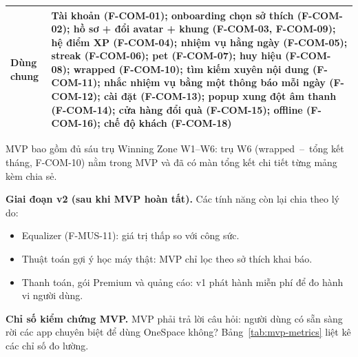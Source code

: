 \begin{table}[H]
\begin{tabularx}{\textwidth}{>{\raggedright\arraybackslash}p{1.8cm} >{\raggedright\arraybackslash}X}
    Dùng chung & Tài khoản (F-COM-01); onboarding chọn sở thích (F-COM-02); hồ sơ + đổi avatar + khung (F-COM-03, F-COM-09); hệ điểm XP (F-COM-04); nhiệm vụ hằng ngày (F-COM-05); streak (F-COM-06); pet (F-COM-07); huy hiệu (F-COM-08); wrapped (F-COM-10); tìm kiếm xuyên nội dung (F-COM-11); nhắc nhiệm vụ bằng một thông báo mỗi ngày (F-COM-12); cài đặt (F-COM-13); popup xung đột âm thanh (F-COM-14); cửa hàng đổi quà (F-COM-15); offline (F-COM-16); chế độ khách (F-COM-18) \\
    \bottomrule
\end{tabularx}
\end{table}

MVP bao gồm đủ sáu trụ Winning Zone W1--W6: trụ W6 (wrapped~--~tổng kết tháng, F-COM-10) nằm trong MVP và đã có màn tổng kết chi tiết từng mảng kèm chia sẻ.

\textbf{Giai đoạn v2 (sau khi MVP hoàn tất).} Các tính năng còn lại chia theo lý do:

\begin{itemize}
    \item Equalizer (F-MUS-11): giá trị thấp so với công sức.
    \item Thuật toán gợi ý học máy thật: MVP chỉ lọc theo sở thích khai báo.
    \item Thanh toán, gói Premium và quảng cáo: v1 phát hành miễn phí để đo hành vi người dùng.
\end{itemize}

\textbf{Chỉ số kiểm chứng MVP.} MVP phải trả lời câu hỏi: người dùng có sẵn sàng rời các app chuyên biệt để dùng OneSpace không? Bảng~\ref{tab:mvp-metrics} liệt kê các chỉ số đo lường.


